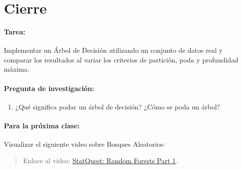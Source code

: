 \documentclass[a4,11pt]{aleph-notas}
\begin{document}
\section*{Cierre}  

\paragraph{Tarea:}  
Implementar un Árbol de Decisión utilizando un conjunto de datos real y comparar los resultados al variar los criterios de partición, poda y profundidad máxima.  

\paragraph{Pregunta de investigación:}  
\begin{enumerate}[leftmargin=*]  
    \item ¿Qué significa podar un árbol de decisión? ¿Cómo se poda un árbol?
\end{enumerate}  

\paragraph{Para la próxima clase:}  
Visualizar el siguiente video sobre Bosques Aleatorios:
    \begin{quote}
        Enlace al video: \href{https://www.youtube.com/watch?v=J4Wdy0Wc_xQ}{StatQuest: Random Forests Part 1}.
    \end{quote}
\end{document}
